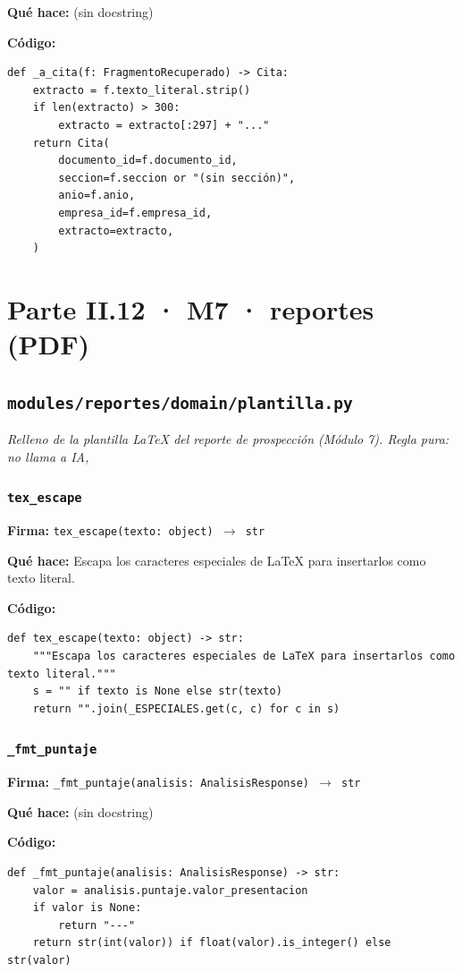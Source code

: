 \documentclass[11pt,a4paper]{article}
\begin{document}
\textbf{Qué hace:} (sin docstring)

\textbf{Código:}
\begin{lstlisting}
def _a_cita(f: FragmentoRecuperado) -> Cita:
    extracto = f.texto_literal.strip()
    if len(extracto) > 300:
        extracto = extracto[:297] + "..."
    return Cita(
        documento_id=f.documento_id,
        seccion=f.seccion or "(sin sección)",
        anio=f.anio,
        empresa_id=f.empresa_id,
        extracto=extracto,
    )
\end{lstlisting}

\section{Parte II.12 · M7 · reportes (PDF)}
\subsection{\texttt{modules/reportes/domain/plantilla.py}}
\textit{Relleno de la plantilla LaTeX del reporte de prospección (Módulo 7). Regla pura: no llama a IA,}

\subsubsection*{\texttt{tex\_escape}}
\textbf{Firma:} \texttt{tex\_escape(texto: object) $\rightarrow$ str}

\textbf{Qué hace:} Escapa los caracteres especiales de LaTeX para insertarlos como texto literal.

\textbf{Código:}
\begin{lstlisting}
def tex_escape(texto: object) -> str:
    """Escapa los caracteres especiales de LaTeX para insertarlos como texto literal."""
    s = "" if texto is None else str(texto)
    return "".join(_ESPECIALES.get(c, c) for c in s)
\end{lstlisting}

\subsubsection*{\texttt{\_fmt\_puntaje}}
\textbf{Firma:} \texttt{\_fmt\_puntaje(analisis: AnalisisResponse) $\rightarrow$ str}

\textbf{Qué hace:} (sin docstring)

\textbf{Código:}
\begin{lstlisting}
def _fmt_puntaje(analisis: AnalisisResponse) -> str:
    valor = analisis.puntaje.valor_presentacion
    if valor is None:
        return "---"
    return str(int(valor)) if float(valor).is_integer() else str(valor)
\end{lstlisting}
\end{document}
